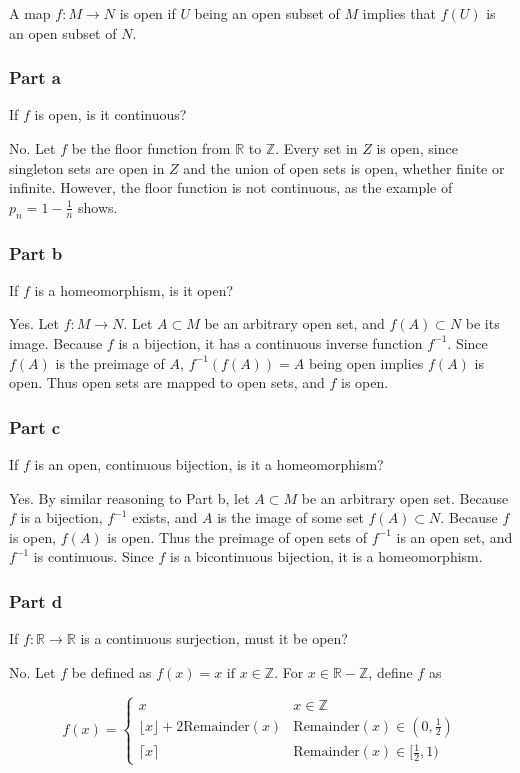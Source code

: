 \documentclass{article}
\begin{document}
A map $f: M \rightarrow N$ is open if $U$ being an open subset of $M$ implies that $f(U)$ is an open subset of $N$.

\subsubsection*{Part a}
If $f$ is open, is it continuous?

No. Let $f$ be the floor function from $\mathbb{R}$ to $\mathbb{Z}$. Every set in $Z$ is open, since singleton sets are open in $Z$ and the union of open sets is open, whether finite or infinite. However, the floor function is not continuous, as the example of $p_n = 1 - \frac{1}{n}$ shows.

\subsubsection*{Part b}
If $f$ is a homeomorphism, is it open?

Yes. Let $f: M \rightarrow N$. Let $A \subset M$ be an arbitrary open set, and $f(A) \subset N$ be its image. Because $f$ is a bijection, it has a continuous inverse function $f^{-1}$. Since $f(A)$ is the preimage of $A$, $f^{-1}(f(A)) = A$ being open implies $f(A)$ is open. Thus open sets are mapped to open sets, and $f$ is open.

\subsubsection*{Part c}
If $f$ is an open, continuous bijection, is it a homeomorphism?

Yes. By similar reasoning to Part b, let $A \subset M$ be an arbitrary open set. Because $f$ is a bijection, $f^{-1}$ exists, and $A$ is the image of some set $f(A) \subset N$. Because $f$ is open, $f(A)$ is open. Thus the preimage of open sets of $f^{-1}$ is an open set, and $f^{-1}$ is continuous. Since $f$ is a bicontinuous bijection, it is a homeomorphism.

\subsubsection*{Part d}
If $f: \mathbb{R} \rightarrow \mathbb{R}$ is a continuous surjection, must it be open?

No. Let $f$ be defined as $f(x) = x \text{ if } x\in\mathbb{Z}$. For $x \in \mathbb{R} - \mathbb{Z}$, define $f$ as

\[
f(x) = 
\begin{cases}
x & x \in \mathbb{Z} \\
\lfloor x \rfloor + 2\text{Remainder}(x) & \text{Remainder}(x) \in (0, \frac{1}{2}) \\
\lceil x \rceil & \text{Remainder}(x) \in [\frac{1}{2}, 1)
\end{cases}
\]
\end{document}

